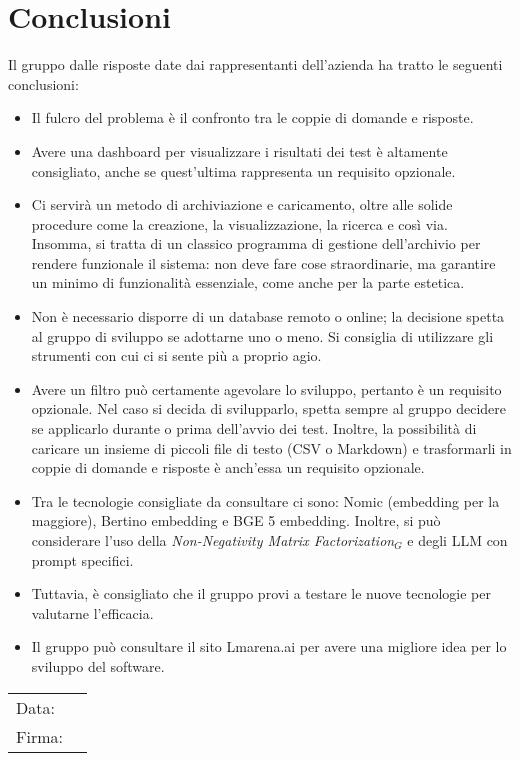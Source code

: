 \documentclass[a4paper, 12pt]{article}
\begin{document}
\section{Conclusioni}
\label{sec:Conclusioni}
Il gruppo dalle risposte date dai rappresentanti dell’azienda ha tratto le seguenti conclusioni:
\begin{itemize}
    \item Il fulcro del problema è il confronto tra le coppie di domande e risposte. 
    \item Avere una dashboard per visualizzare i risultati dei test è altamente consigliato, anche se quest’ultima rappresenta un requisito opzionale.
    \item Ci servirà un metodo di archiviazione e caricamento, oltre alle solide procedure come la creazione, la visualizzazione, la ricerca e così via. Insomma, si tratta di un classico programma di gestione dell’archivio per rendere funzionale il sistema: non deve fare cose straordinarie, ma garantire un minimo di funzionalità essenziale, come anche per la parte estetica.
    \item Non è necessario disporre di un database remoto o online; la decisione spetta al gruppo di sviluppo se adottarne uno o meno. Si consiglia di utilizzare gli strumenti con cui ci si sente più a proprio agio.
    \item Avere un filtro può certamente agevolare lo sviluppo, pertanto è un requisito opzionale. Nel caso si decida di svilupparlo, spetta sempre al gruppo decidere se applicarlo durante o prima dell'avvio dei test. Inoltre, la possibilità di caricare un insieme di piccoli file di testo (CSV o Markdown) e trasformarli in coppie di domande e risposte è anch'essa un requisito opzionale.
    \item Tra le tecnologie consigliate da consultare ci sono: Nomic (embedding per la maggiore), Bertino embedding e BGE 5 embedding. Inoltre, si può considerare l'uso della \textit{Non-Negativity Matrix Factorization$_{G}$} e degli LLM con prompt specifici. 
    \item Tuttavia, è consigliato che il gruppo provi a testare le nuove tecnologie per valutarne l'efficacia.
    \item Il gruppo può consultare il sito Lmarena.ai per avere una migliore idea per lo sviluppo del software.
\end{itemize}
\vfill
{\renewcommand{\arraystretch}{2}
\begin{tabular}{l p{5cm}}
    Data: &  \hrulefill \\
    Firma: & \hrulefill \\
\end{tabular}
}
\end{document}

